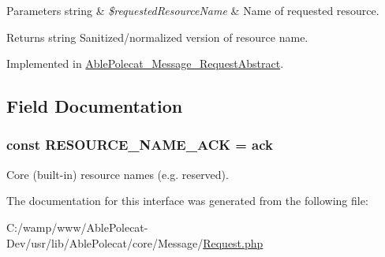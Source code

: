 \begin{DoxyParams}[1]{Parameters}
string & {\em \$requested\+Resource\+Name} & Name of requested resource.\\
\hline
\end{DoxyParams}
\begin{DoxyReturn}{Returns}
string Sanitized/normalized version of resource name. 
\end{DoxyReturn}


Implemented in \hyperlink{class_able_polecat___message___request_abstract_a1e05d92c1527e5fbe83db15156e54457}{Able\+Polecat\+\_\+\+Message\+\_\+\+Request\+Abstract}.



\subsection{Field Documentation}
\hypertarget{interface_able_polecat___message___request_interface_aa207fcff72e63e4066e944379ff91baf}{}
\subsubsection[{R\+E\+S\+O\+U\+R\+C\+E\+\_\+\+N\+A\+M\+E\+\_\+\+A\+C\+K}]{\setlength{\rightskip}{0pt plus 5cm}const R\+E\+S\+O\+U\+R\+C\+E\+\_\+\+N\+A\+M\+E\+\_\+\+A\+C\+K = \textquotesingle{}ack\textquotesingle{}}\label{interface_able_polecat___message___request_interface_aa207fcff72e63e4066e944379ff91baf}
Core (built-\/in) resource names (e.\+g. \textquotesingle{}reserved\textquotesingle{}). 

The documentation for this interface was generated from the following file\+:\begin{DoxyCompactItemize}
\item 
C\+:/wamp/www/\+Able\+Polecat-\/\+Dev/usr/lib/\+Able\+Polecat/core/\+Message/\hyperlink{_request_8php}{Request.\+php}\end{DoxyCompactItemize}
